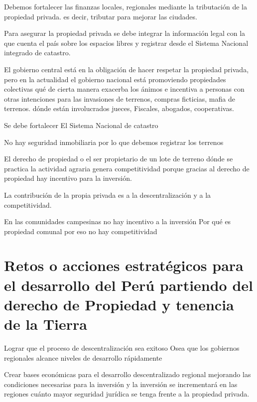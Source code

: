 \documentclass[
  a4paper,
]{article}
\begin{document}
Debemos fortalecer las finanzas locales, regionales mediante la
tributación de la propiedad privada. es decir, tributar para mejorar las
ciudades.

Para asegurar la propiedad privada se debe integrar la información legal
con la que cuenta el país sobre los espacios libres y registrar desde el
Sistema Nacional integrado de catastro.

El gobierno central está en la obligación de hacer respetar la propiedad
privada, pero en la actualidad el gobierno nacional está promoviendo
propiedades colectivas qué de cierta manera exacerba los ánimos e
incentiva a personas con otras intenciones para las invasiones de
terrenos, compras ficticias, mafia de terrenos. dónde están involucrados
jueces, Fiscales, abogados, cooperativas.

Se debe fortalecer El Sistema Nacional de catastro

No hay seguridad inmobiliaria por lo que debemos registrar los terrenos

El derecho de propiedad o el ser propietario de un lote de terreno dónde
se practica la actividad agraria genera competitividad porque gracias al
derecho de propiedad hay incentivo para la inversión.

La contribución de la propia privada es a la descentralización y a la
competitividad.

En las comunidades campesinas no hay incentivo a la inversión Por qué es
propiedad comunal por eso no hay competitividad

\hypertarget{retos-o-acciones-estratuxe9gicos-para-el-desarrollo-del-peruxfa-partiendo-del-derecho-de-propiedad-y-tenencia-de-la-tierra}{%
\section{Retos o acciones estratégicos para el desarrollo del Perú
partiendo del derecho de Propiedad y tenencia de la
Tierra}\label{retos-o-acciones-estratuxe9gicos-para-el-desarrollo-del-peruxfa-partiendo-del-derecho-de-propiedad-y-tenencia-de-la-tierra}}

Lograr que el proceso de descentralización sea exitoso Osea que los
gobiernos regionales alcance niveles de desarrollo rápidamente

Crear bases económicas para el desarrollo descentralizado regional
mejorando las condiciones necesarias para la inversión y la inversión se
incrementará en las regiones cuánto mayor seguridad jurídica se tenga
frente a la propiedad privada.
\end{document}
